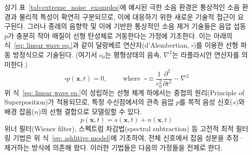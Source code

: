 \documentclass{article}
\begin{document}
상기 표~\ref{tab:extreme_noise_examples}에 예시된 극한 소음 환경은 통상적인 소음 환경과 물리적 특성이 확연히 구분되므로, 이에 대응하기 위한 새로운 기술적 접근이 요구된다. 
그러나 종래의 음향학 및 이에 기반한 통상적인 소음 제거 기술들은 음압 섭동 $p$가 충분히 작아 매질이 선형 탄성체로 거동한다는 가정에 기초한다. 
이는 아래의 식~\eqref{eq: linear wave eq.}과 같이 달랑베르 연산자(d'Alembertian, $\square$)를 이용한 선형 파동 방정식으로 기술된다.
(여기서 $c_{0}$는 평형상태의 음속, $\nabla^2$는 라플라시안 연산자를 의미한다.)
\begin{equation}\label{eq: linear wave eq.}
    \square p (\mathbf{x}, t) = 0, \qquad 
    \text{ where } \;
    \square \equiv \frac{1}{c_0^2}\frac{\partial^2}{\partial t^2} - \nabla^{2}
\end{equation}
위 식~\eqref{eq: linear wave eq.}이 성립하는 선형 체계 하에서는 중첩의 원리(Principle of Superposition)가 적용되므로, 특정 수신점에서의 관측 음압 $p$를 목적 음성 신호($s$)와 배경 잡음($n$)의 선형 결합으로 모델링할 수 있다.
\begin{equation}\label{eq: additive model}
    p (\mathbf{x}, t) = s(\mathbf{x}, t) + n (\mathbf{x}, t)
\end{equation}
위너 필터(Wiener filter), 스펙트럼 차감법(spectral subtraction) 등 고전적 최적 필터링 기법은 위 식~\eqref{eq: additive model}에 기초하여, 전체 신호에서 잡음 성분을 추정·제거하는 방식에 의존해 왔다. 이러한 기법들은 다음의 가정들을 전제로 한다.
\end{document}
